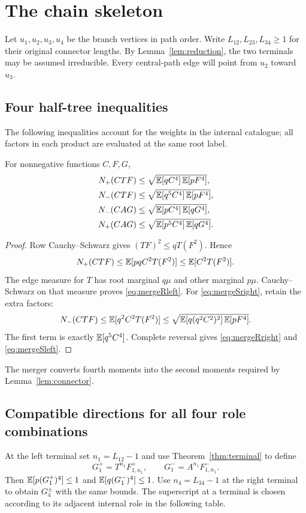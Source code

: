 \section{The chain skeleton}\label{sec:chain}
Let $u_1,u_2,u_3,u_4$ be the branch vertices in path order. Write $L_{12},L_{23},L_{34}\ge1$ for their original connector lengths. By Lemma~\ref{lem:reduction}, the two terminals may be assumed irreducible. Every central-path edge will point from $u_2$ toward $u_3$.

\subsection{Four half-tree inequalities}
The following inequalities account for the weights in the internal catalogue; all factors in each product are evaluated at the same root label.
\begin{lemma}\label{lem:halftree}
For nonnegative functions $C,F,G$,
\begin{align}
 N_+(CTF)&\le\sqrt{\mathbb E[qC^4]\,\mathbb E[pF^4]},\label{eq:mergeRleft}\\
 N_-(CTF)&\le\sqrt{\mathbb E[q^5C^4]\,\mathbb E[pF^4]},\label{eq:mergeSright}\\
 N_-(CAG)&\le\sqrt{\mathbb E[pC^4]\,\mathbb E[qG^4]},\label{eq:mergeRright}\\
 N_+(CAG)&\le\sqrt{\mathbb E[p^5C^4]\,\mathbb E[qG^4]}.\label{eq:mergeSleft}
\end{align}
\end{lemma}
\begin{proof}
Row Cauchy--Schwarz gives $(TF)^2\le qT(F^2)$. Hence
\[
 N_+(CTF)\le\mathbb E[pqC^2T(F^2)]\le\mathbb E[C^2T(F^2)].
\]
The edge measure for $T$ has root marginal $q\mu$ and other marginal $p\mu$. Cauchy--Schwarz on that measure proves \eqref{eq:mergeRleft}. For \eqref{eq:mergeSright}, retain the extra factors:
\[
 N_-(CTF)\le\mathbb E[q^2C^2T(F^2)]
 \le\sqrt{\mathbb E[q(q^2C^2)^2]\,\mathbb E[pF^4]}.
\]
The first term is exactly $\mathbb E[q^5C^4]$. Complete reversal gives \eqref{eq:mergeRright} and \eqref{eq:mergeSleft}.
\end{proof}

The merger converts fourth moments into the second moments required by Lemma~\ref{lem:connector}.

\subsection{Compatible directions for all four role combinations}
At the left terminal set $n_1=L_{12}-1$ and use Theorem~\ref{thm:terminal} to define
\[
 G_1^+=T^{n_1}F^+_{1,n_1},\qquad
 G_1^-=A^{n_1}F^-_{1,n_1}.
\]
Then $\mathbb E[p(G_1^+)^4]\le1$ and $\mathbb E[q(G_1^-)^4]\le1$. Use $n_4=L_{34}-1$ at the right terminal to obtain $G_4^\pm$ with the same bounds. The superscript at a terminal is chosen according to its adjacent internal role in the following table.

